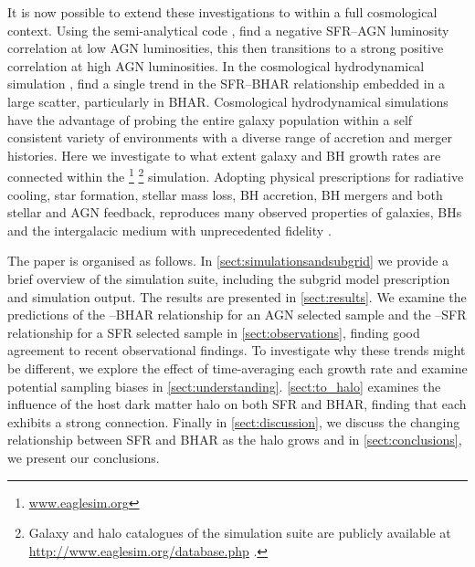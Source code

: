 It is now possible to extend these investigations to within a full cosmological
context. Using the semi-analytical code \galform, \citet{Gutcke2015} find a
negative SFR--AGN luminosity correlation at low AGN luminosities, this then
transitions to a strong positive correlation at high AGN luminosities.  In the
cosmological hydrodynamical simulation \illustris, \citet{Sijacki2015} find a
single trend in the SFR--BHAR relationship embedded in a large scatter,
particularly in BHAR.  Cosmological hydrodynamical simulations have the
advantage of probing the entire galaxy population within a self consistent
variety of environments with a diverse range of accretion and merger histories.
Here we investigate to what extent galaxy and BH growth rates are connected
within the 
\citep[\eagle,][]{Schaye2015,Crain2015} \footnote{\url{www.eaglesim.org}}
\footnote{Galaxy and halo catalogues of the simulation suite are publicly
available at \url{http://www.eaglesim.org/database.php} \citep{McAlpine2015}.}
simulation.  Adopting physical prescriptions for radiative cooling, star
formation, stellar mass loss, BH accretion, BH mergers and both stellar and AGN
feedback, \eagle reproduces many observed properties of galaxies, BHs and the
intergalacic medium with unprecedented fidelity \citep[e.g,][]{Schaye2015,
Furlong2015a, Furlong2015b, Trayford2015, Schaller2015a, Lagos2015,
Rahmati2015, Bahe2016, Crain2016, RosasGuevara2016, Segers2016, Trayford2016}. 

The paper is organised as follows.  In \cref{sect:simulationsandsubgrid} we
provide a brief overview of the \eagle simulation suite, including the subgrid
model prescription and simulation output.  The results are presented in
\cref{sect:results}.  We examine the \eagle predictions of the --BHAR
relationship for an AGN selected sample and the --SFR relationship for
a SFR selected sample in \cref{sect:observations}, finding good agreement to
recent observational findings.  To investigate why these trends might be
different, we explore the effect of time-averaging each growth rate and examine
potential sampling biases in \cref{sect:understanding}.  \cref{sect:to_halo}
examines the influence of the host dark matter halo on both SFR and BHAR,
finding that each exhibits a strong connection.  Finally in
\cref{sect:discussion}, we discuss the changing relationship between SFR and
BHAR as the halo grows and in \cref{sect:conclusions}, we present our
conclusions.

